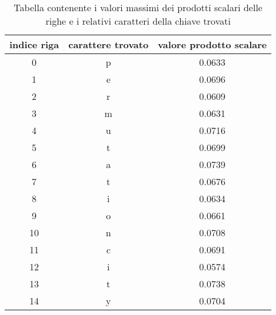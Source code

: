 \documentclass{article}
\begin{document}
\begin{table}[h]
    \centering
    \begin{tabular}{c|c|c}
    
        indice riga & carattere trovato & valore prodotto scalare \\ \hline
        0&p&0.0633\\
        1&e&0.0696\\
        2&r&0.0609\\ 
        3&m&0.0631\\ 
        4&u&0.0716\\ 
        5&t&0.0699\\ 
        6&a&0.0739\\ 
        7&t&0.0676\\ 
        8&i&0.0634\\ 
        9&o&0.0661\\ 
        10&n&0.0708\\ 
        11&c&0.0691\\ 
        12&i&0.0574\\ 
        13&t&0.0738\\            
        14&y&0.0704 
    \end{tabular}
    \caption{Tabella contenente i valori massimi dei prodotti scalari delle righe e i relativi caratteri della chiave trovati}
    \label{tab:scalProd}
\end{table}                             
\end{document}
